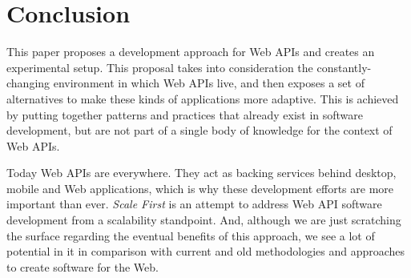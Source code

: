 \documentclass[10pt,article]{IEEEtran}
\begin{document}




\section{Conclusion}
This paper proposes a development approach for Web APIs and creates an experimental setup. This proposal takes into consideration the constantly-changing environment in which Web APIs live, and then exposes a set of alternatives to make these kinds of applications more adaptive. This is achieved by putting together patterns and practices that already exist in software development, but are not part of a single body of knowledge for the context of Web APIs.

Today Web APIs are everywhere. They act as backing services behind desktop, mobile and Web applications, which is why these development efforts are more important than ever.  \textit{Scale First} is an attempt to address Web API software development from a scalability standpoint. And, although we are just scratching the surface regarding the eventual benefits of this approach, we see a lot of potential in it in comparison with current and old methodologies and approaches to create software for the Web.





%
\end{document}
